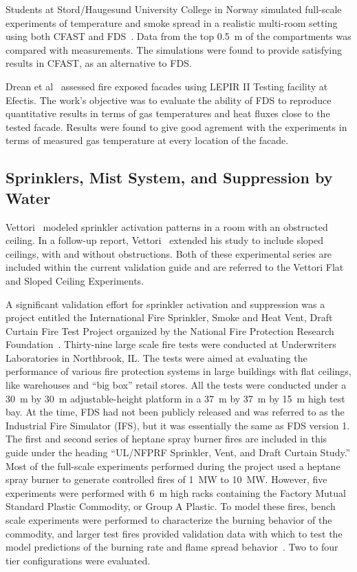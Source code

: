 Students at Stord/Haugesund University College in Norway simulated full-scale experiments of temperature and smoke spread in a
realistic multi-room setting using both CFAST and FDS~\cite{Storm:thesis}. Data from the top 0.5~m of the compartments was compared with measurements.
The simulations were found to provide satisfying results in CFAST, as an alternative to FDS.

Drean et al~\cite{Drean2018} assessed fire exposed facades using LEPIR II Testing facility at Efectis. The work's objective was to evaluate the ability of FDS to reproduce quantitative results in terms of gas temperatures and heat fluxes close to the tested facade. Results were found to give good agrement with the experiments in terms of measured gas temperature at every location of the facade.






\subsection{Sprinklers, Mist System, and Suppression by Water}

Vettori~\cite{Vettori:1} modeled sprinkler activation patterns in a room with an obstructed ceiling. In a follow-up report, Vettori~\cite{Vettori:2} extended his study to include sloped ceilings, with and without obstructions. Both of these experimental series are included within the current validation guide and are referred to the Vettori Flat and Sloped Ceiling Experiments.

A  significant validation effort  for sprinkler  activation and suppression was a project entitled the International Fire Sprinkler, Smoke and Heat Vent, Draft Curtain Fire Test Project organized by the National Fire Protection  Research Foundation~\cite{McGrattan:5}. Thirty-nine large scale fire tests were conducted at Underwriters Laboratories in Northbrook, IL. The tests were aimed at evaluating the performance of various fire protection systems in large buildings with flat ceilings, like warehouses and ``big box'' retail stores. All the tests were conducted under a 30~m by 30~m adjustable-height platform in a 37~m by 37~m by 15~m high test bay. At the time, FDS had not been publicly released and was referred to as the Industrial Fire Simulator (IFS), but it was essentially the same as FDS version 1. The first and second series of heptane spray burner fires are included in this guide under the heading ``UL/NFPRF Sprinkler, Vent, and Draft Curtain Study.'' Most of the full-scale experiments performed during the project used a heptane spray burner to  generate controlled fires of 1~MW to 10~MW. However, five experiments were performed with 6~m high racks containing the Factory Mutual Standard Plastic Commodity, or Group A Plastic. To model these fires, bench scale experiments were performed to characterize the burning behavior of the commodity, and larger test fires provided validation data with which to test the model predictions of the burning rate and flame spread behavior~\cite{Hamins:1,Hamins:IAFSS2002}. Two to four tier configurations were evaluated.

